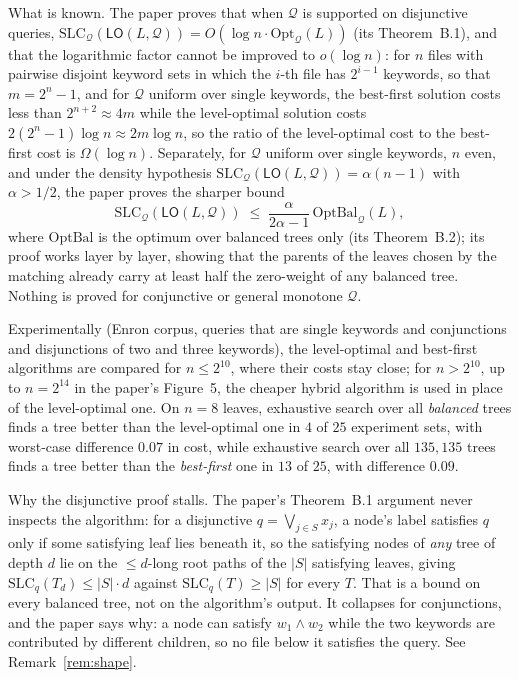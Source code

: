 \documentclass{conjura-conjecture}
\newcommand{\Qd}{\mathcal{Q}}
\newcommand{\SLC}{\mathrm{SLC}}
\newcommand{\Opt}{\mathrm{Opt}}
\newcommand{\OptBal}{\mathrm{OptBal}}
\newcommand{\LO}{\mathsf{LO}}
\begin{document}
What is known. The paper proves that when $\Qd$ is supported on disjunctive
queries, $\SLC_{\Qd}(\LO(L,\Qd)) = O(\log n \cdot \Opt_{\Qd}(L))$ (its
Theorem~B.1), and that the logarithmic factor cannot be improved to
$o(\log n)$: for $n$ files with pairwise disjoint keyword sets in which the
$i$-th file has $2^{i-1}$ keywords, so that $m = 2^{n} - 1$, and for $\Qd$
uniform over single keywords, the best-first solution costs less than
$2^{n+2} \approx 4m$ while the level-optimal solution costs
$2(2^{n}-1)\log n \approx 2m \log n$, so the ratio of the level-optimal
cost to the best-first cost is $\Omega(\log n)$. Separately, for $\Qd$
uniform over single keywords, $n$ even, and under the density hypothesis
$\SLC_{\Qd}(\LO(L,\Qd)) = \alpha(n-1)$ with $\alpha > 1/2$, the paper
proves the sharper bound
\[
  \SLC_{\Qd}(\LO(L,\Qd)) \;\le\;
  \frac{\alpha}{2\alpha-1}\,\OptBal_{\Qd}(L),
\]
where $\OptBal$ is the optimum over balanced trees only (its
Theorem~B.2); its proof works layer by layer, showing that the parents of
the leaves chosen by the matching already carry at least half the
zero-weight of any balanced tree. Nothing is proved for conjunctive or
general monotone $\Qd$.

Experimentally (Enron corpus, queries that are single keywords and
conjunctions and disjunctions of two and three keywords), the level-optimal
and best-first algorithms are compared for $n \le 2^{10}$, where their
costs stay close; for $n > 2^{10}$, up to $n = 2^{14}$ in the paper's
Figure~5, the cheaper hybrid algorithm is used in place of the
level-optimal one. On $n = 8$ leaves, exhaustive search over all
\emph{balanced} trees finds a tree better than the level-optimal one in $4$
of $25$ experiment sets, with worst-case difference $0.07$ in cost, while
exhaustive search over all $135{,}135$ trees finds a tree better than the
\emph{best-first} one in $13$ of $25$, with difference $0.09$.

Why the disjunctive proof stalls. The paper's Theorem~B.1 argument never
inspects the algorithm: for a disjunctive $q = \bigvee_{j \in S} x_j$, a
node's label satisfies $q$ only if some satisfying leaf lies beneath it, so
the satisfying nodes of \emph{any} tree of depth $d$ lie on the
$\le d$-long root paths of the $|S|$ satisfying leaves, giving
$\SLC_q(T_d) \le |S| \cdot d$ against $\SLC_q(T) \ge |S|$ for every $T$.
That is a bound on every balanced tree, not on the algorithm's output. It
collapses for conjunctions, and the paper says why: a node can satisfy
$w_1 \wedge w_2$ while the two keywords are contributed by different
children, so no file below it satisfies the query. See
Remark~\ref{rem:shape}.
\end{document}
